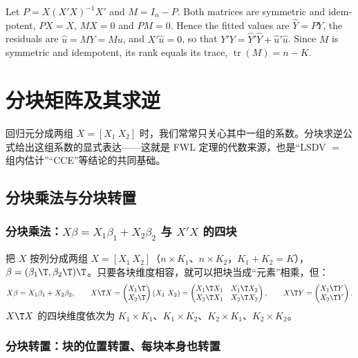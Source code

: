 \begin{english}
Let $P=X(X'X)^{-1}X'$ and $M=I_n-P$. Both matrices are symmetric and idempotent, $PX=X$, $MX=0$ and $PM=0$. Hence the fitted values are $\hat Y=PY$, the residuals are $\hat u=MY=Mu$, and $X'\hat u=0$, so that $Y'Y=\hat Y'\hat Y+\hat u'\hat u$. Since $M$ is symmetric and idempotent, its rank equals its trace, $\operatorname{tr}(M)=n-K$.
\end{english}

\section{分块矩阵及其求逆}\label{sec:U01a-block}

回归元分成两组 $X=[X_1\ X_2]$ 时，我们常常只关心其中一组的系数。分块求逆公式给出这组系数的显式表达——这就是 FWL 定理的代数来源，也是“LSDV $=$ 组内估计”“CCE”等结论的共同基础。

\subsection{分块乘法与分块转置}

\subsubsection{分块乘法：\texorpdfstring{$X\beta=X_1\beta_1+X_2\beta_2$ 与 $X'X$}{X beta = X1 beta1 + X2 beta2 and X'X} 的四块}

把 $X$ 按列分成两组 $X=[X_1\ X_2]$（$n\times K_1$、$n\times K_2$，$K_1+K_2=K$），$\beta=(\beta_1\T,\beta_2\T)\T$。只要各块维度相容，就可以把块当成“元素”相乘，但：
\[
X\beta=X_1\beta_1+X_2\beta_2,\qquad
X\T X=\begin{pmatrix}X_1\T\\X_2\T\end{pmatrix}(X_1\ X_2)=\begin{pmatrix}X_1\T X_1&X_1\T X_2\\X_2\T X_1&X_2\T X_2\end{pmatrix},\qquad
X\T Y=\begin{pmatrix}X_1\T Y\\X_2\T Y\end{pmatrix}.
\]
$X\T X$ 的四块维度依次为 $K_1\times K_1$、$K_1\times K_2$、$K_2\times K_1$、$K_2\times K_2$。

\subsubsection{分块转置：块的位置转置、每块本身也转置}

